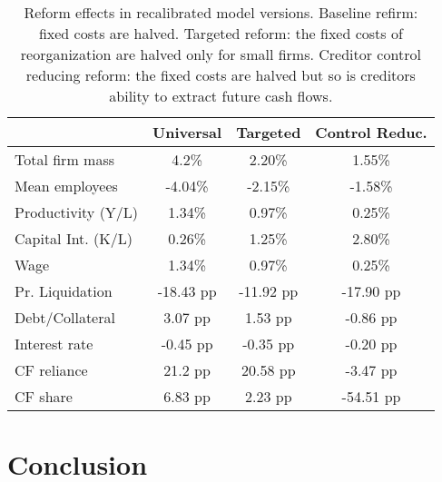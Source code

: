 \documentclass[12pt]{article}
\begin{document}
\begin{table}[H]
    \centering
    \begin{tabular}{lccc}
     & \textbf{Universal} & \textbf{Targeted} & \textbf{Control Reduc.} \\    
    \toprule
    Total firm mass & 4.2\%  & 2.20\% & 1.55\%  \\  
    Mean employees & -4.04\%  & -2.15\% & -1.58\%   \\  
    Productivity (Y/L) & 1.34\%  & 0.97\% & 0.25\%  \\  
    Capital Int. (K/L) & 0.26\%  & 1.25\% & 2.80\%  \\  
    Wage & 1.34\%  & 0.97\% & 0.25\%  \vspace{2mm}  \\  
    Pr. Liquidation & -18.43 pp  & -11.92 pp & -17.90 pp \\  
    Debt/Collateral & 3.07 pp  &  1.53 pp & -0.86 pp  \\  
    Interest rate & -0.45 pp  & -0.35 pp & -0.20 pp  \\  
    CF reliance & 21.2 pp  & 20.58 pp & -3.47 pp  \\    
    CF share & 6.83 pp  & 2.23 pp & -54.51 pp  \\  
    \bottomrule
    \end{tabular}
    \caption{Reform effects in recalibrated model versions. Baseline refirm: fixed costs are halved. Targeted reform: the fixed costs of reorganization are halved only for small firms. Creditor control reducing reform: the fixed costs are halved but so is creditors ability to extract future cash flows.}
    \label{tab:percentage_changes2}
\end{table}



\section{Conclusion}
\end{document}
